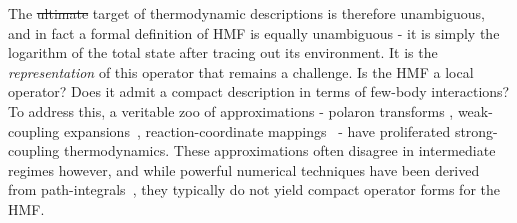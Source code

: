 ﻿\documentclass[aps,prl,twocolumn,superscriptaddress,showpacs,floatfix]{revtex4-2}
\makeatletter
\providecommand{\DIFdeltex}[1]{{\protect\color{red}\sout{#1}}} %
\providecommand{\DIFdelbegin}{} %
\providecommand{\DIFdelend}{} %
\providecommand{\DIFdel}[1]{\texorpdfstring{\DIFdeltex{#1}}{}} %
\providecommand{\DIFscaledelfig}{0.5}
\newlength{\DIFdelgraphicswidth} %
\newlength{\DIFdelgraphicsheight} %
\providecommand{\DIFdelincludegraphics}[2][]{%
\sbox{\DIFdelgraphicsbox}{\DIFOincludegraphics[#1]{#2}}%
\settoboxwidth{\DIFdelgraphicswidth}{\DIFdelgraphicsbox} %
\settoboxtotalheight{\DIFdelgraphicsheight}{\DIFdelgraphicsbox} %
\scalebox{\DIFscaledelfig}{%
\parbox[b]{\DIFdelgraphicswidth}{\usebox{\DIFdelgraphicsbox}\\[-\baselineskip] \rule{\DIFdelgraphicswidth}{0em}}\llap{\resizebox{\DIFdelgraphicswidth}{\DIFdelgraphicsheight}{%
\setlength{\unitlength}{\DIFdelgraphicswidth}%
\begin{picture}(1,1)%
\thicklines\linethickness{2pt} %
{\color[rgb]{1,0,0}\put(0,0){\framebox(1,1){}}}%
{\color[rgb]{1,0,0}\put(0,0){\line( 1,1){1}}}%
{\color[rgb]{1,0,0}\put(0,1){\line(1,-1){1}}}%
\end{picture}%
}\hspace*{3pt}}} %
} %
\DeclareRobustCommand{\DIFdelbegin}{\DIFOdelbegin \let\includegraphics\DIFdelincludegraphics} %
\DeclareRobustCommand{\DIFdelend}{\DIFOaddend \let\includegraphics\DIFOincludegraphics} %
\let\sout@orig\sout %
\renewcommand{\sout}[1]{\ifmmode\text{\sout@orig{\ensuremath{#1}}}\else\sout@orig{#1}\fi} %
\makeatother
\begin{document}
The \DIFdelbegin \DIFdel{ultimate }\DIFdelend target of thermodynamic descriptions is therefore unambiguous, and in fact a formal definition of HMF is equally unambiguous - it is simply the logarithm of the total state after tracing out its environment. It is the \emph{representation} of this operator that remains a challenge. Is the HMF a local operator? Does it admit a compact description in terms of few-body interactions? To address this, a veritable zoo of approximations - polaron transforms \cite{jangNonequilibriumTheoryElectronic2008}, weak-coupling expansions~\cite{cresserWeakUltrastrongCoupling2021a}, reaction-coordinate mappings~ \cite{ShubrookIlesSmithNazir2025, duGeneralizedHamiltonianMeanforce2025a,nazirReactionCoordinateMapping2018,AntoSztrikacsNazirSegal2023,IlesSmithDijkstraLambertNazir2016} - have proliferated strong-coupling thermodynamics. These approximations often disagree in intermediate regimes however, and while powerful numerical techniques have been derived from path-integrals~\cite{moixEquilibriumreducedDensityMatrix2012,chenRigorousStochasticMatrix2014,makriExploitingClassicalDecoherence2014,tanimuraReducedHierarchicalEquations2014,songCalculationCorrelatedInitial2015,WaltersWang2024}, they typically do not yield compact operator forms for the HMF.
\end{document}

